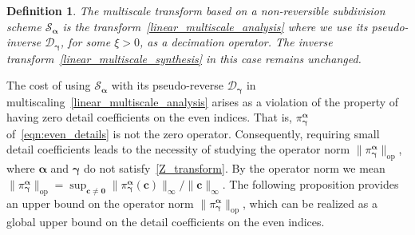 \documentclass[12pt]{article}
\newtheorem{defin}{Definition}[section]
\begin{document}
\begin{defin}
    The multiscale transform based on a non-reversible subdivision scheme $\mathcal{S}_{\boldsymbol{\alpha}}$ is the transform~\eqref{linear_multiscale_analysis} where we use its pseudo-inverse $\mathcal{D}_{\boldsymbol{\gamma}}$, for some $\xi>0$, as a decimation operator. The inverse transform~\eqref{linear_multiscale_synthesis} in this case remains unchanged.
\end{defin}


The cost of using $\mathcal{S}_{\boldsymbol{\alpha}}$ with its pseudo-reverse $\mathcal{D}_{\boldsymbol{\gamma}}$ in multiscaling~\eqref{linear_multiscale_analysis} arises as a violation of the property of having zero detail coefficients on the even indices. That is, $\pi^{\boldsymbol{\alpha}}_{\boldsymbol{\gamma}}$ of~\eqref{eqn:even_details} is not the zero operator. Consequently, requiring small detail coefficients leads to the necessity of studying the operator norm $\|\pi^{\boldsymbol{\alpha}}_{\boldsymbol{\gamma}}\|_{\text{op}}$, where $\boldsymbol{\alpha}$ and $\boldsymbol{\gamma}$ do not satisfy~\eqref{Z_transform}. By the operator norm we mean $\|\pi^{\boldsymbol{\alpha}}_{\boldsymbol{\gamma}}\|_{\text{op}}=\sup_{\boldsymbol{c}\neq \boldsymbol{0}}\|\pi^{\boldsymbol{\alpha}}_{\boldsymbol{\gamma}}(\boldsymbol{c})\|_{\infty}/\|\boldsymbol{c}\|_{\infty}$. The following proposition provides an upper bound on the operator norm $\|\pi^{\boldsymbol{\alpha}}_{\boldsymbol{\gamma}}\|_{\text{op}}$, which can be realized as a global upper bound on the detail coefficients on the even indices.
\end{document}
